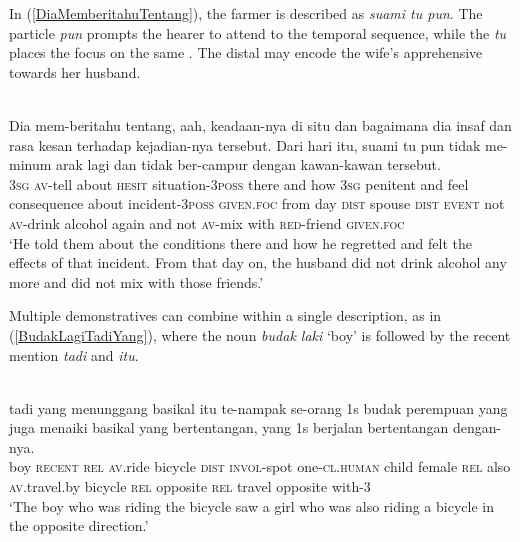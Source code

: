\documentclass[output=paper
,modfonts
,nonflat]{langsci/langscibook}
\begin{document}
\noindent
In (\ref{DiaMemberitahuTentang}), the farmer is described as \emph{suami tu pun}. The particle \emph{pun} prompts the hearer to attend to the temporal sequence, while the  \emph{tu} places the focus on the same . The distal may encode the wife's apprehensive  towards her husband.

\ea\label{DiaMemberitahuTentang} 
\\
\gll Dia mem-beritahu tentang, aah,      keadaan-nya       {di situ} dan  bagaimana dia insaf    dan  rasa kesan       terhadap kejadian-nya     tersebut.  Dari hari itu,  {\ob}suami  tu  pun{\cb}  tidak me-minum arak lagi  dan  tidak ber-campur dengan kawan-kawan     tersebut.\\
\textsc{3sg} \textsc{av-}tell        about    \textsc{hesit} situation-\textsc{3poss} there   and  how       \textsc{3sg} penitent and  feel consequence about    incident-\textsc{3poss} \textsc{given.foc} from day   \textsc{dist}   spouse \textsc{dist} \textsc{event} not   \textsc{av-}drink   alcohol again and  not   \textsc{av-}mix       with   \textsc{red}-friend \textsc{given.foc}\\
\glt `He told them about the conditions there and how he regretted and felt the  effects of that incident. From that day on, the husband did  not drink alcohol any more and did not mix with those friends.'
\z

\noindent
Multiple demonstratives can combine within a single description, as in (\ref{BudakLagiTadiYang}), where the noun \emph{budak laki} `boy' is followed by the recent mention \emph{tadi} and \emph{itu}. 

\ea\label{BudakLagiTadiYang} 
\\
  tadi     yang menunggang       basikal itu{\cb} te-nampak se-orang {\USOParen}1s{\USCParen} budak perempuan yang juga menaiki       basikal yang bertentangan, yang {\USOParen}1s{\USCParen}   berjalan bertentangan dengan-nya.\\
boy  \textsc{recent} \textsc{rel}  \textsc{av.}ride bicycle \textsc{dist} \textsc{invol-}spot  one-\textsc{cl.human} {}   child female    \textsc{rel}  also \textsc{av.}travel.by   bicycle \textsc{rel}  opposite     \textsc{rel} {} travel  opposite     with-3\\
\glt `The boy who was riding the bicycle saw a girl who was also riding a bicycle in the opposite direction.'
\z
\end{document}
